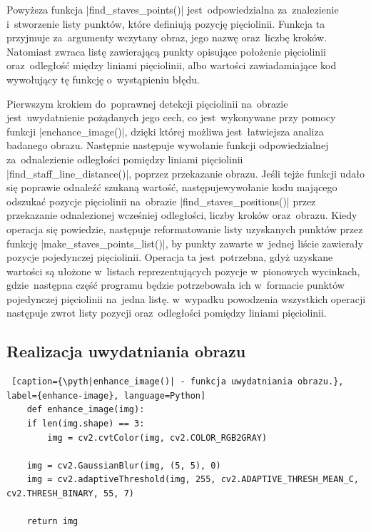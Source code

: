 Powyższa funkcja \pyth|find_staves_points()| jest~odpowiedzialna za~znalezienie i~stworzenie listy punktów, które definiują pozycję pięciolinii. Funkcja ta przyjmuje za~argumenty wczytany obraz, jego nazwę oraz~liczbę kroków. Natomiast zwraca listę zawierającą punkty opisujące położenie pięciolinii oraz~odległość między liniami pięciolinii, albo wartości zawiadamiające kod wywołujący tę funkcję o~wystąpieniu błędu.

Pierwszym krokiem do~poprawnej detekcji pięciolinii na~obrazie jest~uwydatnienie pożądanych jego cech, co jest~wykonywane przy pomocy funkcji \pyth|enchance_image()|, dzięki której możliwa jest~łatwiejsza analiza badanego obrazu. Następnie następuje wywołanie funkcji odpowiedzialnej za~odnalezienie odległości pomiędzy liniami pięciolinii \pyth|find_staff_line_distance()|, poprzez przekazanie obrazu. Jeśli tejże funkcji udało się poprawie odnaleźć szukaną wartość, następuje\linebreak wywołanie kodu mającego odszukać pozycje pięciolinii na~obrazie \pyth|find_staves_positions()| przez przekazanie odnalezionej wcześniej odległości, liczby kroków oraz~obrazu. Kiedy operacja się powiedzie, następuje reformatowanie listy uzyskanych punktów przez funkcję \linebreak \pyth|make_staves_points_list()|, by punkty zawarte w~jednej liście zawierały pozycje pojedynczej pięciolinii. Operacja ta jest~potrzebna, gdyż uzyskane wartości są ułożone w~listach reprezentujących pozycje w~pionowych wycinkach, gdzie~następna część programu będzie potrzebowała ich w~formacie punktów pojedynczej pięciolinii na~jedna listę. w~wypadku powodzenia wszystkich operacji następuje zwrot listy pozycji oraz~odległości pomiędzy liniami pięciolinii.



\subsection{Realizacja uwydatniania obrazu} \label{enhance_image_impl}

\begin{lstlisting} [caption={\pyth|enhance_image()| - funkcja uwydatniania obrazu.}, label={enhance-image}, language=Python]
	def enhance_image(img):
	if len(img.shape) == 3:
		img = cv2.cvtColor(img, cv2.COLOR_RGB2GRAY)
	
	img = cv2.GaussianBlur(img, (5, 5), 0)
	img = cv2.adaptiveThreshold(img, 255, cv2.ADAPTIVE_THRESH_MEAN_C, cv2.THRESH_BINARY, 55, 7)
	
	return img
\end{lstlisting}

